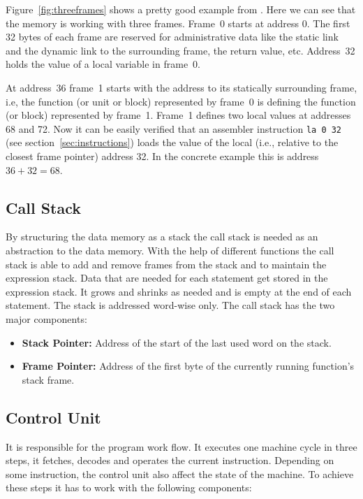 Figure~\ref{fig:threeframes} shows a pretty good example from \cite{bauer_p._2017}. Here we can see that the memory is working with three frames. Frame~0 starts at address 0. The first 32 bytes of each frame are reserved for administrative data like the static link and the dynamic link to the surrounding frame, the return value, etc. Address~32 holds the value of a local variable in frame~0.

\lstset{language=NoBeardAsm}

At address~36 frame~1 starts with the address to its statically surrounding frame, i.e, the function (or unit or block) represented by frame~0 is defining the function (or block) represented by frame~1. Frame~1 defines two local values at addresses 68 and 72. Now it can be easily verified that an assembler instruction \lstinline$la 0 32$ (see section~\ref{sec:instructions}) loads the value of the local (i.e., relative to the closest frame pointer) address 32. In the concrete example this is address $36 + 32 = 68$.

\subsection{Call Stack}
By structuring the data memory as a stack the call stack is needed as an abstraction to the data memory. With the help of different functions the call stack is able to add and remove frames from the stack and to maintain the expression stack. Data that are needed for each statement get stored in the expression stack. It grows and shrinks as needed and is empty at the end of each statement. The stack is addressed word-wise only. The call stack has the two major components:

\begin{itemize}
\item \textbf{Stack Pointer: }Address of the start of the last used word on the stack. 
\item \textbf{Frame Pointer: }Address of the first byte of the currently running function's stack frame. 
\end{itemize}

\subsection{Control Unit}
It is responsible for the program work flow. It executes one machine cycle in three steps, it fetches, decodes and operates the current instruction. Depending on some instruction, the control unit also affect the state of the machine. To achieve these steps it has to work with the following components:


